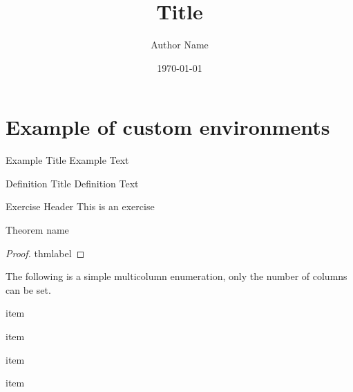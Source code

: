 \documentclass{uhcourse}
\title{Title}
\author{Author Name}
\date{\today}
\begin{document}
\maketitle
\thispagestyle{empty}

\clearpage
\hypertarget{contents}{}
\thispagestyle{fancy}
\tableofcontents

\clearpage
\section{Example of custom environments}
\lipsum[1]
\begin{example}{Example Title}
    Example Text
    \lipsum[66]
\end{example}


\begin{definition}{Definition Title}
    Definition Text
    \lipsum[66]
\end{definition}

\begin{exercise}{Exercise Header}
    This is an exercise
    \lipsum[66]
\end{exercise}

\begin{theorem}[thmlabel]{Theorem name}
    \lipsum[66]
\end{theorem}

\begin{proof}{thmlabel}
    \lipsum[66]
\end{proof}

The following is a simple multicolumn enumeration, only the number of columns can be set.
\begin{enumulti}{2}
    \item{item}
    \item{item}
    \item{item}
    \item{item}
\end{enumulti}


\listofexercises
\end{document}
